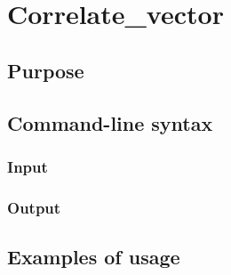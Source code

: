 \section{Correlate\_vector}
\subsection{Purpose}
\subsection{Command-line syntax}
\subsubsection{Input}
\subsubsection{Output}
\subsection{Examples of usage}